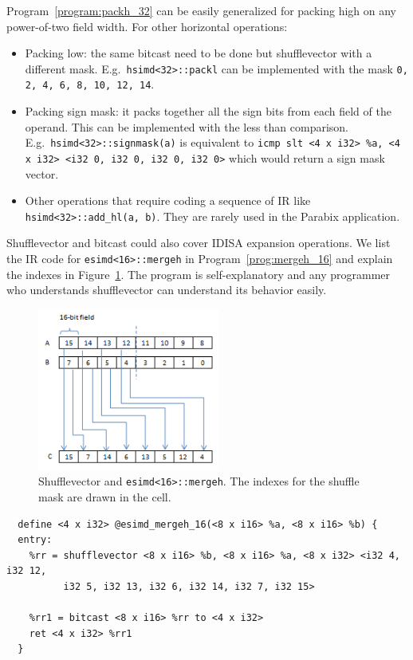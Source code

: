 Program~\ref{program:packh_32} can be easily generalized for packing high on any power-of-two field width. For other horizontal operations:
\begin{itemize}
    \item Packing low: the same bitcast need to be done but shufflevector with a different mask. E.g.\ {\tt hsimd<32>::packl} can be implemented with the mask {\tt 0, 2, 4, 6, 8, 10, 12, 14}.
    \item Packing sign mask: it packs together all the sign bits from each field of the operand. This can be implemented with the less than comparison. E.g.\ {\tt hsimd<32>::signmask(a)} is equivalent to \verb|icmp slt <4 x i32> %a, <4 x i32> <i32 0, i32 0, i32 0, i32 0>| which would return a {\tt <4 x i1>} sign mask vector.
    \item Other operations that require coding a sequence of IR like {\tt hsimd<32>::add\_hl(a, b)}. They are rarely used in the Parabix application.
\end{itemize}

Shufflevector and bitcast could also cover IDISA expansion operations. We list the IR code for {\tt esimd<16>::mergeh} in Program~\ref{prog:mergeh_16} and explain the indexes in Figure~\ref{fig:mergeh_16}. The program is self-explanatory and any programmer who understands shufflevector can understand its behavior easily.

\begin{figure}[ht!]
\centering
\includegraphics[width=60mm]{draw/mergeh_16.png}
\caption[Implement {\tt esimd<16>::mergeh} with shufflevector]{Shufflevector and {\tt esimd<16>::mergeh}. The indexes for the shuffle mask are drawn in the cell.}
\label{fig:mergeh_16}
\end{figure}

\begin{program}
\begin{verbatim}
  define <4 x i32> @esimd_mergeh_16(<8 x i16> %a, <8 x i16> %b) {
  entry:
    %rr = shufflevector <8 x i16> %b, <8 x i16> %a, <8 x i32> <i32 4, i32 12,
          i32 5, i32 13, i32 6, i32 14, i32 7, i32 15>

    %rr1 = bitcast <8 x i16> %rr to <4 x i32>
    ret <4 x i32> %rr1
  }
\end{verbatim}
\caption[Shufflevector implementation of mergeh.]{Shufflevector and {\tt esimd<16>::mergeh} in LLVM IR\@. Expansion operations double the width of fields.}
\label{prog:mergeh_16}
\end{program}

